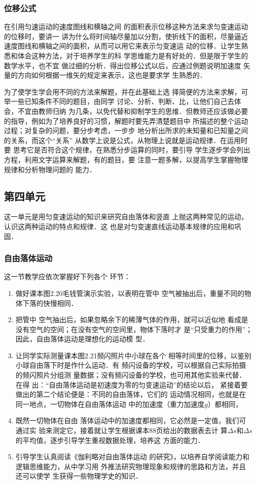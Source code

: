 \subsubsection{位移公式}

在引用匀速运动的速度图线和横轴之间
的面积表示位移这种方法来求匀变速运动的位移时，要讲一
讲为什么将时间轴尽量加以分割，使折线下的面积，尽量逼近
速度图线和横轴之间的面积，从而可以用它来表示匀变速运
动的位移．让学生熟悉和体会这种方法，对于培养学生的科
学思维能力是有好处的．但是限于学生的数学水平，也不宜
做过细的分析．得出位移公式以后，应通过例题说明加速度
矢量的方向如何根据一维矢的规定来表示，这也是要求学
生熟悉的．

为了使学生学会用不同的方法来解题，并在此基础上选
择简便的方法来求解，可举一些已知条件不同的题目，由同学
讨论、分析、判断、比，让他们自己去体会，不宜由教师归纳
为几条，以免代替和抑制学生的思维．但教师还应该做必要
的指导，例如为了培养良好的习惯，解题时要先弄清楚题目中
所描述的整个运动过程；对复杂的问题，要分步考虑，一步步
地分析出所求的未知量和已知量之间的关系，而这个“关系”
从数学上说是公式，从物理上说就是运动规律．在运用时要
思考它是否符合这个规律，在熟悉分步运算的同时，要引导
学生逐步学会列出方程，利用文字运算来解题，有的题目，要
注意一题多解，以提高学生掌握物理规律和分析物理问题的
能力．

\subsection{第四单元}
这一单元是用匀变速运动的知识来研究自由落体和竖直
上抛这两种常见的运动，认识这两种运动的特点和规律．这
也是对匀变速直线运动基本规律的应用和巩固．

\subsubsection{自由落体运动}

这一节教学应依次掌握好下列各个
环节：
\begin{enumerate}
\item 做好课本图2.20毛钱管演示实验，以表明在管中
空气被抽出后，重量不同的物体下落的快慢相同．
\item 把管中
空气抽出后，如果忽略余下的稀薄气体的作用，就可以近似地
看成是没有空气的空间；在没有空气的空间里，物体下落时才
是“只受重力的作用”；因此，自由落体运动是理想化的运动模
型．
\item 让同学实际测量课本图2.21频闪照片中小球在各个
相等时间里的位移，以鉴别小球自由落下时是作什么运动．有
频闪设备的学校，可以根据自己实际拍摄的频闪照片分组测
量数据；没有频闪设备的学校，也可用其他实验来代替．在得
出：“自由落体运动是初速度为零的匀变速运动”的结论以后，
紧接着要做出的第二个结论便是：不同的自由落体，它们的
运动情况相同，也就是在同一地点，一切物体在自由落体运动
中的加速度（重力加速度$g$）都相同，
\item 既然一切物体在自由
落体运动中的加速度都相同，它必然是一定值，我们可通过实
验来测定它，接着就让学生根据课本88页给出的数据表去计
算$\Delta s$和$\Delta s$的平均值，逐步引导学生重视数据处理，培养这
方面的能力．   
 \item 引导学生认真阅读《伽利略对自由落体运动
的研究》，以培养自学阅读能力和逻辑思维能力，从中学习用
外推法研究物理现象和规律的思路和方法，并且还可以使学
生获得一些物理学史的知识．
\end{enumerate}


